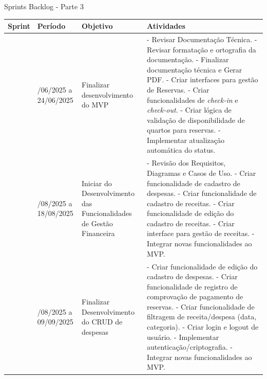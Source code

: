 \documentclass[
	12pt,				%
	openany,			%
	oneside,			%
	a4paper,			%
	english,			%
	french,				%
	spanish,			%
	brazil				%
	]{abntex2}
\begin{document}
\begin{quadro}[H]
	\caption{Sprints Backlog - Parte 3} 
	\label{sprints_backlog_3} 
	\begin{tabular}{|>{\centering\arraybackslash}m{1.2cm}|>{\centering\arraybackslash}m{3cm}|>{\centering\arraybackslash}m{4.5cm}|>{\raggedright\arraybackslash}m{5.5cm}|}
		\hline
		\textbf{Sprint} & \textbf{Período} & \textbf{Objetivo} & \textbf{Atividades} \\
		\hline	
		6 & 04/06/2025 a 24/06/2025 & Finalizar desenvolvimento do MVP & - Revisar Documentação Técnica. \newline - Revisar formatação e ortografia da documentação. \newline - Finalizar documentação técnica e Gerar  PDF. \newline - Criar interfaces para gestão de Reservas. \newline - Criar funcionalidades de \textit{check-in} e \textit{check-out}. \newline - Criar lógica de validação de disponibilidade de quartos para reservas. \newline - Implementar atualização automática do status.\\ \hline	
		7 & 12/08/2025 a 18/08/2025 & Iniciar do Desenvolvimento das Funcionalidades de Gestão Financeira &
		- Revisão dos Requisitos, Diagramas e Casos de Uso. \newline - Criar funcionalidade de cadastro de despesas. \newline - Criar funcionalidade de cadastro de receitas. \newline - Criar funcionalidade de edição do cadastro de receitas. \newline - Criar interface para gestão de receitas. \newline - Integrar novas funcionalidades ao MVP.\\ \hline	
		8 & 27/08/2025 a 09/09/2025 & Finalizar Desenvolvimento do CRUD de despesas & - Criar funcionalidade de edição do cadastro de despesas. \newline - Criar funcionalidade de registro de comprovação de pagamento de reservas. \newline - Criar funcionalidade de filtragem de receita/despesa (data, categoria). \newline - Criar login e logout de usuário. \newline - Implementar autenticação/criptografia. \newline - Integrar novas funcionalidades ao MVP.\\ \hline	
	\end{tabular}
\end{quadro}	
\end{document}
